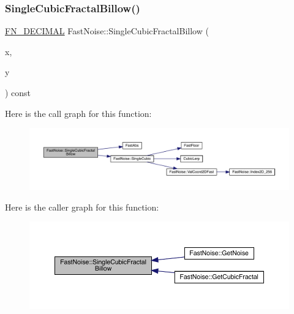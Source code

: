 \subsubsection{\texorpdfstring{Single\+Cubic\+Fractal\+Billow()}{SingleCubicFractalBillow()}\hspace{0.1cm}{\footnotesize\ttfamily [1/2]}}
{\footnotesize\ttfamily \mbox{\hyperlink{_fast_noise_8h_a75a9ef6d2541c4921815b885bfd449c3}{F\+N\+\_\+\+D\+E\+C\+I\+M\+AL}} Fast\+Noise\+::\+Single\+Cubic\+Fractal\+Billow (\begin{DoxyParamCaption}\item[{\mbox{\hyperlink{_fast_noise_8h_a75a9ef6d2541c4921815b885bfd449c3}{F\+N\+\_\+\+D\+E\+C\+I\+M\+AL}}}]{x,  }\item[{\mbox{\hyperlink{_fast_noise_8h_a75a9ef6d2541c4921815b885bfd449c3}{F\+N\+\_\+\+D\+E\+C\+I\+M\+AL}}}]{y }\end{DoxyParamCaption}) const\hspace{0.3cm}{\ttfamily [private]}}

Here is the call graph for this function\+:
\nopagebreak
\begin{figure}[H]
\begin{center}
\leavevmode
\includegraphics[width=350pt]{class_fast_noise_a679b755d2540f9c26cb1d978f92fbef2_cgraph}
\end{center}
\end{figure}
Here is the caller graph for this function\+:
\nopagebreak
\begin{figure}[H]
\begin{center}
\leavevmode
\includegraphics[width=350pt]{class_fast_noise_a679b755d2540f9c26cb1d978f92fbef2_icgraph}
\end{center}
\end{figure}
\mbox{\label{class_fast_noise_a8595f37169b6133ccd822d21af3acd60}} 
